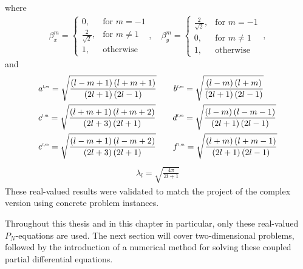 where
\begin{align*}
\beta_x^{m}=
\left\{
\begin{array}{ll}
0, & \text{for } m = -1\\
\frac{2}{\sqrt{2}}, & \text{for } m \neq 1\\
1, & \text{otherwise }
\end{array}
\right.
,\quad
\beta_y^{m}=
\left\{
\begin{array}{ll}
\frac{2}{\sqrt{2}}, & \text{for } m = -1\\
0, & \text{for } m \neq 1\\
1, & \text{otherwise }
\end{array}
\right.
\ ,
\end{align*}
and
\begin{align*}
&
a^{\scaleto{l,m}{4pt}}= \sqrt{\frac{\left(l-m+1\right)\left(l+m+1\right)}{\left(2l+1\right)\left(2l-1\right)}} \qquad
b^{\scaleto{l,m}{4pt}}= \sqrt{\frac{\left(l-m\right)\left(l+m\right)}{\left(2l+1\right)\left(2l-1\right)}}
\\&
c^{\scaleto{l,m}{4pt}}= \sqrt{\frac{\left(l+m+1\right)\left(l+m+2\right)}{\left(2l+3\right)\left(2l+1\right)}} \qquad
d^{\scaleto{l,m}{4pt}}= \sqrt{\frac{\left(l-m\right)\left(l-m-1\right)}{\left(2l+1\right)\left(2l-1\right)}}
\\&
e^{\scaleto{l,m}{4pt}}= \sqrt{\frac{\left(l-m+1\right)\left(l-m+2\right)}{\left(2l+3\right)\left(2l+1\right)}} \qquad
f^{\scaleto{l,m}{4pt}}= \sqrt{\frac{\left(l+m\right)\left(l+m-1\right)}{\left(2l+1\right)\left(2l-1\right)}}
\end{align*}
\begin{align*}
\lambda_l=\sqrt{\frac{4\pi}{2l+1}}
\end{align*}
These real-valued results were validated to match the project of the complex version using concrete problem instances.

Throughout this thesis and in this chapter in particular, only these real-valued $P_N$-equations are used. The next section will cover two-dimensional problems, followed by the introduction of a numerical method for solving these coupled partial differential equations.










